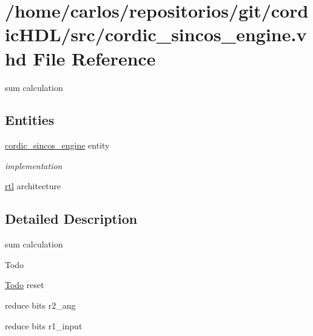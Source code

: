 \hypertarget{cordic__sincos__engine_8vhd}{}\section{/home/carlos/repositorios/git/cordic\+H\+D\+L/src/cordic\+\_\+sincos\+\_\+engine.vhd File Reference}
\label{cordic__sincos__engine_8vhd}


sum calculation  


\subsection*{Entities}
\begin{DoxyCompactItemize}
\item 
\hyperlink{classcordic__sincos__engine}{cordic\+\_\+sincos\+\_\+engine} entity
\begin{DoxyCompactList}\small\item\em implementation \end{DoxyCompactList}\item 
\hyperlink{classcordic__sincos__engine_1_1rtl}{rtl} architecture
\end{DoxyCompactItemize}


\subsection{Detailed Description}
sum calculation 

\begin{DoxyRefDesc}{Todo}
\item[\hyperlink{todo__todo000001}{Todo}]reset 

reduce bits r2\+\_\+ang 

reduce bits r1\+\_\+input \end{DoxyRefDesc}
